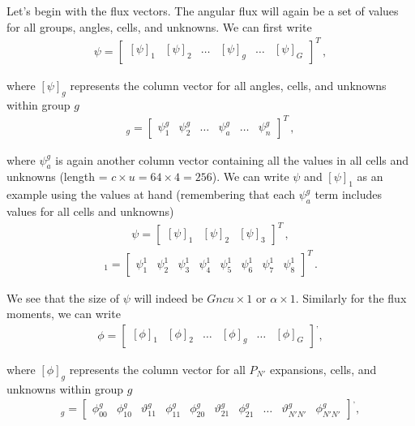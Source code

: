 \documentclass[10pt]{article}
\begin{document}
Let's begin with the flux vectors. The angular flux will again be a set of values for all groups, angles, cells, and unknowns. We can first write 
%
\begin{align*}
\psi =
\begin{bmatrix}
    [\psi]_1 & [\psi]_2 & \dots & [\psi]_g & \dots & [\psi]_G 
\end{bmatrix} ^ T\,,
\end{align*}

where $[\psi]_g$ represents the column vector for all angles, cells, and unknowns within group $g$
%
\begin{align*}
[\psi]_g =
\begin{bmatrix}
    \psi_1^g & \psi_2^g & \dots & \psi_a^g &  \dots & \psi_n^g
\end{bmatrix} ^ T\,,
\end{align*}

where $\psi_a^g$ is again another column vector containing all the values in all cells and unknowns (length = $c \times u = 64 \times 4 = 256$). We can write $\psi$ and $[\psi]_1$ as an example using the values at hand (remembering that each $\psi_a^g$ term includes values for all cells and unknowns)
%
\begin{align*}
\psi =
\begin{bmatrix}
    [\psi]_1 & [\psi]_2 & [\psi]_3
\end{bmatrix} ^ T\,,
\end{align*}
\vspace{-20pt}
\begin{align*}
[\psi]_1 =
\begin{bmatrix}
    \psi_1^1 & \psi_2^1 & \psi_3^1 & \psi_4^1 & \psi_5^1 & \psi_6^1 & \psi_7^1 & \psi_8^1
\end{bmatrix} ^ T\,.
\end{align*}

We see that the size of $\psi$ will indeed be $Gncu \times 1$ or $\alpha \times 1$. Similarly for the flux moments, we can write
%
\begin{align*}
\phi =
\begin{bmatrix}
    [\phi]_1 & [\phi]_2 & \dots & [\phi]_g & \dots & [\phi]_G 
\end{bmatrix} ^ ,,
\end{align*}

where $[\phi]_g$ represents the column vector for all $P_{N'}$ expansions, cells, and unknowns within group $g$
%
\begin{align*}
[\phi]_g =
\begin{bmatrix}
    \phi_{00}^g & \phi_{10}^g & \vartheta_{11}^g & \phi_{11}^g & \phi_{20}^g & \vartheta_{21}^g & \phi_{21}^g &  \dots & \vartheta_{N'N'}^g & \phi_{N'N'}^g
\end{bmatrix} ^ ,,
\end{align*}
\end{document}
